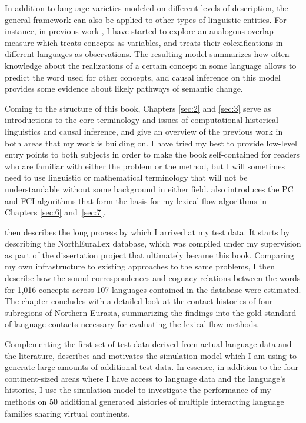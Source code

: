 \largerpage
In addition to language varieties modeled on different levels of description, the general framework can also be applied to other types of linguistic entities. For instance, in previous work \citep{dellert2016b}, I have started to explore an analogous overlap measure which treats concepts as variables, and treats their colexifications in different languages as observations. The resulting model summarizes how often knowledge about the realizations of a certain concept in some language allows to predict the word used for other concepts, and causal inference on this model provides some evidence about likely pathways of semantic change.

Coming to the structure of this book, Chapters \ref{sec:2} and \ref{sec:3} serve as introductions to the core terminology and issues of computational historical linguistics and causal inference, and give an overview of the previous work in both areas that my work is building on. I have tried my best to provide low-level entry points to both subjects in order to make the book self-contained for readers who are familiar with either the problem or the method, but I will sometimes need to use linguistic or mathematical terminology that will not be understandable without some background in either field.  also introduces the PC and FCI algorithms that form the basis for my lexical flow algorithms in Chapters \ref{sec:6} and~\ref{sec:7}.

 then describes the long process by which I arrived at my test data. It starts by describing the NorthEuraLex database, which was compiled under my supervision as part of the dissertation project that ultimately became this book. Comparing my own infrastructure to existing approaches to the same problems, I then describe how the sound correspondences and cognacy relations between the words for 1,016 concepts across 107 languages contained in the database were estimated. The chapter concludes with a detailed look at the contact histories of four subregions of Northern Eurasia, summarizing the findings into the gold-standard of language contacts necessary for evaluating the lexical flow methods.

Complementing the first set of test data derived from actual language data and the literature,  describes and motivates the simulation model which I am using to generate large amounts of additional test data. In essence, in addition to the four continent-sized areas where I have access to language data and the language's histories, I use the simulation model to investigate the performance of my methods on 50 additional generated histories of multiple interacting language families sharing virtual continents.

